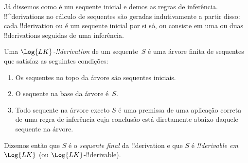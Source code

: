 \documentclass[../../../include/open-logic-section]{subfiles}
\begin{document}
      {}
      {}


\begin{explain}
Já dissemos como é um sequente inicial e demos as regras de
inferência.  !!^{derivation}s no cálculo de sequentes são
geradas indutivamente a partir disso: cada !!{derivation} ou é um
sequente inicial por si só, ou consiste em uma ou duas !!{derivation}s
seguidas de uma inferência.
\end{explain}

\begin{defn}
Uma \emph{$\Log{LK}$-!!{derivation}} de um sequente~$S$ é uma árvore finita
de sequentes que satisfaz as seguintes condições:
\begin{enumerate}
\item Os sequentes no topo da árvore são sequentes iniciais.
\item O sequente na base da árvore é~$S$.
\item Todo sequente na árvore exceto $S$ é uma premissa de uma aplicação
  correta de uma regra de inferência cuja conclusão está diretamente
  abaixo daquele sequente na árvore.
\end{enumerate}
Dizemos então que $S$ é o \emph{sequente final} da !!{derivation} e
que $S$ é \emph{!!{derivable} em $\Log{LK}$} (ou $\Log{LK}$-!!{derivable}).
\end{defn}
\end{document}
